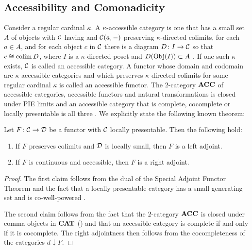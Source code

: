 \subsection{Accessibility and Comonadicity}\label{subsec:comonadicity}
Consider a regular cardinal $\kappa$. A $\kappa$-accessible category is one that has a small set $A$ of objects with $\mathcal{C}$ having and $\mathcal{C}(a,-)$ preserving $\kappa$-directed colimits, for each $a\in A$, and for each object $c$ in $\mathcal{C}$ there is a diagram $D\colon I\to \mathcal{C}$ so that $c\cong \operatorname*{colim} D$, where $I$ is a $\kappa$-directed poset and $D(\mathrm{Obj}(I))\subset A$ \cite{LPC}. If one such $\kappa$ exists, $\mathcal{C}$ is called an accessible category. A functor whose domain and codomain are $\kappa$-accessible categories and which preserves $\kappa$-directed colimits for some regular cardinal $\kappa$ is called an accessible functor. The $2$-category $\mathbf{ACC}$ of accessible categories, accessible functors and natural transformations is closed under PIE limits \cite{MakkaiPare1989AccessibleCategories, LPC} and an accessible category that is complete, cocomplete or locally presentable is all three \cite[Corollary 2.47]{LPC}. We explicitly state the following known theorem: 
\begin{theorem}\label{AAFT}
    Let $F\colon \mathcal{C}\to \mathcal{D}$ be a functor with $\mathcal{C}$ locally presentable. Then the following hold:
    \begin{enumerate}
        \item If $F$ preserves colimits and $\mathcal{D}$ is locally small, then $F$ is a left adjoint.
        \item If $F$ is continuous and accessible, then $F$ is a right adjoint.
    \end{enumerate}
\end{theorem}
\begin{proof}
The first claim follows from the dual of the Special Adjoint Functor Theorem \cite{MacLane1998} and the fact that a locally presentable category has a small generating set and is co-well-powered \cite{LPC}. 

The second claim follows from the fact that the $2$-category $\mathbf{ACC}$ is closed under comma objects in $\mathbf{CAT}$ (\cite{MakkaiPare1989AccessibleCategories}) and that an accessible category is complete if and only if it is cocomplete. The right adjointness then follows from the cocompleteness of the categories $d\downarrow F$.
\end{proof}

